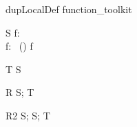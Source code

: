 \documentclass{article}
\begin{document}
\begin{zsection}
\SECTION dupLocalDef \parents function\_toolkit
\end{zsection}

\begin{schema}{S}
   f: \nat \pfun \nat \\
   f: \power~(\nat \cross \nat)
\where
   f \neq \emptyset
\end{schema}

\begin{schema}{T}
   S
\end{schema}

\begin{schema}{R}
   S; T
\end{schema}

\begin{schema}{R2}
   S; S; T
\end{schema}
\end{document}
